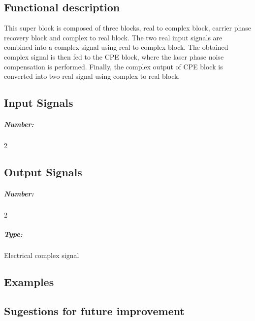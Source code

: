 \subsection*{Functional description}

This super block is composed of three blocks, real to complex block, carrier phase recovery block and complex to real block. The two real input signals are combined into a complex signal using real to complex block. The obtained complex signal is then fed to the CPE block, where the laser phase noise compensation is performed. Finally, the complex output of CPE block is converted into two real signal using complex to real block. 


\pagebreak
\subsection*{Input Signals}

\subparagraph*{Number:} 2

\subsection*{Output Signals}

\subparagraph*{Number:} 2

\subparagraph*{Type:} Electrical complex signal

\subsection*{Examples}

\subsection*{Sugestions for future improvement}


